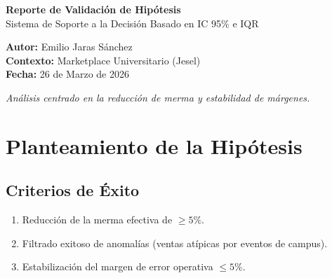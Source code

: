 \documentclass[12pt, a4paper]{article}
\begin{document}
\begin{titlepage}
    \centering
    \vspace*{2cm}
    \vspace{1.5cm}
    
    {\Huge\bfseries\textcolor{primaryblue}{Reporte de Validación de Hipótesis}\\[0.4cm]}
    {\Large\textcolor{primaryblue!70}{Sistema de Soporte a la Decisión Basado en IC 95\% e IQR}}
    
    \vspace{2cm}
    \textbf{Autor:} Emilio Jaras Sánchez\\[0.3cm]
    \textbf{Contexto:} Marketplace Universitario (Jesel)\\[0.3cm]
    \textbf{Fecha:} 26 de Marzo de 2026
    
    \vfill
    {\normalsize\textit{Análisis centrado en la reducción de merma y estabilidad de márgenes.}}
\end{titlepage}

\tableofcontents
\newpage

\section{Planteamiento de la Hipótesis}

\begin{center}
\end{center}

\subsection{Criterios de Éxito}
\begin{enumerate}
    \item Reducción de la merma efectiva de $\geq 5\%$.
    \item Filtrado exitoso de anomalías (ventas atípicas por eventos de campus).
    \item Estabilización del margen de error operativa $\leq 5\%$.
\end{enumerate}
\end{document}
